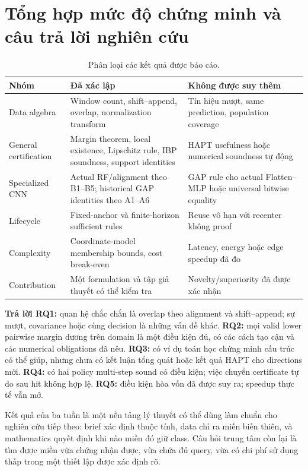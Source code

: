 \documentclass[11pt,a4paper]{article}
\theoremstyle{remark}
\begin{document}
\section{Tổng hợp mức độ chứng minh và câu trả lời nghiên cứu}
\begin{table}[!htbp]\centering\small
\caption{Phân loại các kết quả được báo cáo.}
\begin{tabularx}{\linewidth}{@{}p{3.6cm}YY@{}}\toprule
Nhóm & Đã xác lập & Không được suy thêm\\\midrule
Data algebra & Window count, shift--append, overlap, normalization transform
& Tín hiệu mượt, same prediction, population coverage\\
General certification & Margin theorem, local existence, Lipschitz rule,
IBP soundness, support identities & HAPT usefulness hoặc numerical soundness tự động\\
Specialized CNN & Actual RF/alignment theo B1--B5; historical GAP identities theo A1--A6
& GAP rule cho actual Flatten--MLP hoặc universal bitwise equality\\
Lifecycle & Fixed-anchor và finite-horizon sufficient rules & Reuse vô hạn
với recenter không proof\\
Complexity & Coordinate-model membership bounds, cost break-even
& Latency, energy hoặc edge speedup đã đo\\
Contribution & Một formulation và tập giả thuyết có thể kiểm tra
& Novelty/superiority đã được xác nhận\\\bottomrule
\end{tabularx}
\end{table}
\textbf{Trả lời RQ1:} quan hệ chắc chắn là overlap theo alignment và
shift--append; sự mượt, covariance hoặc cùng decision là những vấn đề khác.
\textbf{RQ2:} mọi valid lower pairwise margin dương trên domain là một
điều kiện đủ, có các cách tạo cận và các numerical obligations đã nêu.
\textbf{RQ3:} có ví dụ toán học chứng minh cấu trúc có thể giúp, nhưng
chưa có kết luận tổng quát hoặc kết quả HAPT cho directions mới.
\textbf{RQ4:} có hai policy multi-step sound có điều kiện; việc chuyển
certificate tự do sau hit không hợp lệ.
\textbf{RQ5:} điều kiện hòa vốn đã được suy ra; speedup thực tế vẫn mở.

Kết quả của ba tuần là một nền tảng lý thuyết có thể dùng làm chuẩn cho
nghiên cứu tiếp theo: brief xác định thuộc tính, data chỉ ra miền biến thiên,
và mathematics quyết định khi nào miền đó giữ class. Câu hỏi trung tâm còn
lại là tìm được miền vừa chứng nhận được, vừa chứa đủ query, vừa có chi
phí sử dụng thấp trong một thiết lập được xác định rõ.
\end{document}
